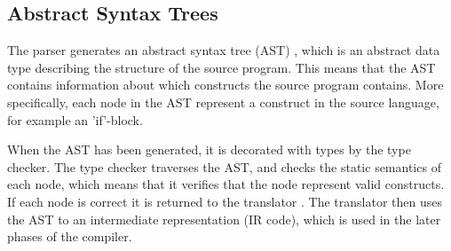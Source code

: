 \subsection{Abstract Syntax Trees}
The parser generates an abstract syntax tree (AST) \citep{CraftingACompiler}, which is an abstract data type describing the structure of the source program. This means that the AST contains information about which constructs the source program contains. More specifically, each node in the AST represent a construct in the source language, for example an 'if'-block.

When the AST has been generated, it is decorated with types by the type checker. The type checker traverses the AST, and checks the static semantics of each node, which means that it verifies that the node represent valid constructs. If each node is correct it is returned to the translator \citep{CraftingACompiler}. The translator then uses the AST to an intermediate representation (IR code), which is used in the later phases of the compiler.
